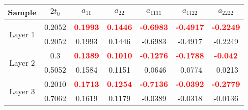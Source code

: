 {
\centering
     	     \begin{tabular}{|c|c|c|c|c|c|c|}
     	     \hline Sample & $ 2 t_{0}$ & $ a_{11}$ & $ a_{22}$ & $ a_{1111} $ & $ a_{1122}$ & $ a_{2222} $ \\ 
     	     \hline \multirow{2}{*}{Layer 1} & 0.2052 & \textcolor{red}{\textbf{0.1993}} & \textcolor{red}{\textbf{0.1446}} & \textcolor{red}{\textbf{-0.6983}} & \textcolor{red}{\textbf{-0.4917}} & \textcolor{red}{\textbf{-0.2249}}\\
     	     \cline{2-7} & 0.2052 & 0.1993 & 0.1446 & -0.6983 & -0.4917 & -0.2249\\
    	     \hline \multirow{2}{*}{Layer 2} & 0.3 & \textcolor{red}{\textbf{0.1389}} & \textcolor{red}{\textbf{0.1010}} & \textcolor{red}{\textbf{-0.1276}} & \textcolor{red}{\textbf{-0.1788}} & \textcolor{red}{\textbf{-0.042}}\\
     	     \cline{2-7} & 0.5052 & 0.1584 & 0.1151 & -0.0646 & -0.0774 & -0.0213\\
     	     \hline \multirow{2}{*}{Layer 3} & 0.2010 & \textcolor{red}{\textbf{0.1713}} & \textcolor{red}{\textbf{0.1254}} & \textcolor{red}{\textbf{-0.7136}} & \textcolor{red}{\textbf{-0.0392}} & \textcolor{red}{\textbf{-0.2779}}\\
     	     \cline{2-7} & 0.7062 & 0.1619 & 0.1179 & -0.0389 & -0.0318 & -0.0136\\

      \hline
    \end{tabular}
}


